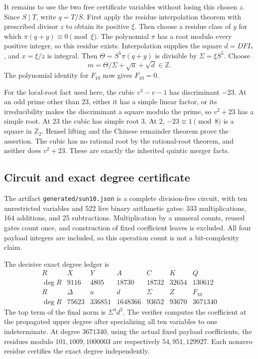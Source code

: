 It remains to use the two free certificate variables without losing this
chosen \(z\). Since \(S\mid T\), write \(q=T/S\). First apply the
residue interpolation theorem with prescribed divisor \(z\) to obtain
its positive \(\xi\). Then choose a residue class of \(y\) for which
\(\pi(q+y)\equiv0\pmod\xi\). The polynomial \(\pi\) has a root modulo
every positive integer, so this residue exists. Interpolation supplies
the square \(d=DFI_*\), and \(x=\xi/z\) is integral. Then
\(\Theta=S^5\pi(q+y)\) is divisible by \(\Sigma=\xi S^5\). Choose \[
 m=\Theta/\Sigma+\sqrt a+\sqrt d\in\mathbb Z.
\] The polynomial identity for \(F_{10}\) now gives \(F_{10}=0\).

For the local-root fact used here, the cubic \(v^3-v-1\) has
discriminant \(-23\). At an odd prime other than 23, either it has a
simple linear factor, or its irreducibility makes the discriminant a
square modulo the prime, so \(v^2+23\) has a simple root. At 23 the
cubic has simple root 3. At 2, \(-23\equiv1\pmod8\) is a square in
\(\mathbb Z_2\). Hensel lifting and the Chinese remainder theorem prove
the assertion. The cubic has no rational root by the rational-root
theorem, and neither does \(v^2+23\). These are exactly the inherited
quintic merger facts.
\subsection{Circuit and exact degree certificate}
The artifact \texttt{generated/sun10.json} is a complete division-free circuit, with ten unrestricted variables and 522 live binary arithmetic gates: 333 multiplications, 164 additions, and 25 subtractions. Multiplication by a numeral counts, reused gates count once, and construction of fixed coefficient leaves is excluded. All four payload integers are included, so this operation count is not a bit-complexity claim.

The decisive exact degree ledger is
\[
\begin{array}{c|rrrrrr}
R&X&Y&A&C&K&Q\\\hline
\deg R&9116&4805&18730&18732&32654&130612\\
R&\Delta&a&d&\Sigma&Z&F_{10}\\\hline
\deg R&75623&336851&1648366&93652&93670&3671340
\end{array}
\]
The top term of the final norm is $\Sigma^4d^2$. The verifier computes the coefficient at the propagated upper degree after specializing all ten variables to one indeterminate. At degree $3671340$, using the actual fixed payload coefficients, the residues modulo $101,1009,1000003$ are respectively $54,951,129927$. Each nonzero residue certifies the exact degree independently.

